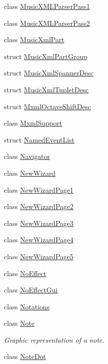 \begin{DoxyCompactItemize}
\item 
class \hyperlink{class_ms_1_1_music_x_m_l_parser_pass1}{Music\+X\+M\+L\+Parser\+Pass1}
\item 
class \hyperlink{class_ms_1_1_music_x_m_l_parser_pass2}{Music\+X\+M\+L\+Parser\+Pass2}
\item 
class \hyperlink{class_ms_1_1_music_xml_part}{Music\+Xml\+Part}
\item 
struct \hyperlink{struct_ms_1_1_music_xml_part_group}{Music\+Xml\+Part\+Group}
\item 
struct \hyperlink{struct_ms_1_1_music_xml_spanner_desc}{Music\+Xml\+Spanner\+Desc}
\item 
struct \hyperlink{struct_ms_1_1_music_xml_tuplet_desc}{Music\+Xml\+Tuplet\+Desc}
\item 
struct \hyperlink{struct_ms_1_1_mxml_octave_shift_desc}{Mxml\+Octave\+Shift\+Desc}
\item 
class \hyperlink{class_ms_1_1_mxml_support}{Mxml\+Support}
\item 
struct \hyperlink{struct_ms_1_1_named_event_list}{Named\+Event\+List}
\item 
class \hyperlink{class_ms_1_1_navigator}{Navigator}
\item 
class \hyperlink{class_ms_1_1_new_wizard}{New\+Wizard}
\item 
class \hyperlink{class_ms_1_1_new_wizard_page1}{New\+Wizard\+Page1}
\item 
class \hyperlink{class_ms_1_1_new_wizard_page2}{New\+Wizard\+Page2}
\item 
class \hyperlink{class_ms_1_1_new_wizard_page3}{New\+Wizard\+Page3}
\item 
class \hyperlink{class_ms_1_1_new_wizard_page4}{New\+Wizard\+Page4}
\item 
class \hyperlink{class_ms_1_1_new_wizard_page5}{New\+Wizard\+Page5}
\item 
class \hyperlink{class_ms_1_1_no_effect}{No\+Effect}
\item 
class \hyperlink{class_ms_1_1_no_effect_gui}{No\+Effect\+Gui}
\item 
class \hyperlink{class_ms_1_1_notations}{Notations}
\item 
class \hyperlink{class_ms_1_1_note}{Note}
\begin{DoxyCompactList}\small\item\em Graphic representation of a note. \end{DoxyCompactList}\item 
class \hyperlink{class_ms_1_1_note_dot}{Note\+Dot}

\end{DoxyCompactItemize}
